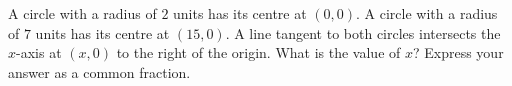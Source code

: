 A circle with a radius of $2$ units has its centre at $(0,0)$. A circle with a radius of $7$ units has its centre at $(15,0)$. A line tangent to both circles intersects the $x$-axis at $(x,0)$ to the right of the origin. What is the value of $x$? Express your answer as a common fraction.
